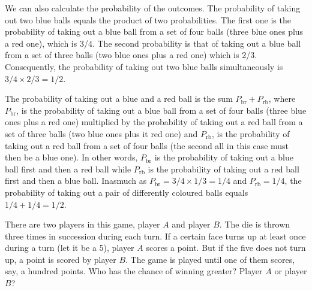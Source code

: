 We can also calculate the probability of the outcomes. The
probability of taking out two blue balls equals the product of two
probabilities. The ﬁrst one is the probability of taking out a blue ball
from a set of four balls (three blue ones plus a red one), which is 3/4.
The second probability is that of taking out a blue ball from a set of
three balls (two blue ones plus a red one) which is 2/3. Consequently,
the probability of taking out two blue balls simultaneously is $3/4 \times
2/3 = 1/2$.

The probability of taking out a blue and a red ball is the sum $P_{\text{br}} +
P_{\text{rb}}$, where $P_{\text{br}}$, is the probability of taking out a blue ball from a set of four balls (three blue ones plus a red one) multiplied by the probability of taking out a red ball from a set of three balls (two blue ones plus it red one) and $P_{\text{rb}}$, is the probability of taking out a red ball from a set of four balls (the second all in this case must then be a blue one). In other words, $P_{\text{br}}$ is the probability of taking out a blue ball ﬁrst and then a red ball while $P_{\text{rb}}$ is the probability of taking out a red ball ﬁrst and then a blue ball. Inasmuch as $P_{\text{br}} = 3/4 \times 1/3 = 1/4$ and $P_{\text{rb}} = 1/4$, the probability of taking out a pair of differently coloured balls equals $1/4 + 1/4 = 1/2$. 

%


  There are two players in this game, player
$A$ and player $B$. The die is thrown three times in succession during each
turn. If a certain face turns up at least once during a turn (let it be a 5),
player $A$ scores a point. But if the five does not turn up, a point is
scored by player $B$. The game is played until one of them scores, say,
a hundred points. Who has the chance of winning greater? Player $A$ or
player $B$?

